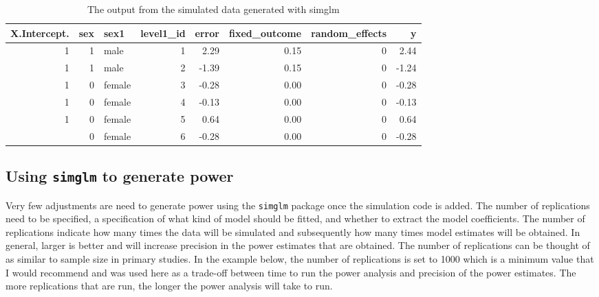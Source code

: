 \documentclass[man,mask,floatsintext]{apa6}
\begin{document}
\begin{table}[t]

\caption{\label{tab:simulate-data-out}The output from the simulated data generated with simglm}
\centering
\begin{tabular}{rrlrrrrr}
\toprule
X.Intercept. & sex & sex1 & level1\_id & error & fixed\_outcome & random\_effects & y\\
\midrule
1 & 1 & male & 1 & 2.29 & 0.15 & 0 & 2.44\\
1 & 1 & male & 2 & -1.39 & 0.15 & 0 & -1.24\\
1 & 0 & female & 3 & -0.28 & 0.00 & 0 & -0.28\\
1 & 0 & female & 4 & -0.13 & 0.00 & 0 & -0.13\\
1 & 0 & female & 5 & 0.64 & 0.00 & 0 & 0.64\\
\addlinespace
1 & 0 & female & 6 & -0.28 & 0.00 & 0 & -0.28\\
\bottomrule
\end{tabular}
\end{table}

\hypertarget{using-simglm-to-generate-power}{%
\subsection{\texorpdfstring{Using \texttt{simglm} to generate power}{Using simglm to generate power}}\label{using-simglm-to-generate-power}}

Very few adjustments are need to generate power using the \texttt{simglm} package once the simulation code is added. The number of replications need to be specified, a specification of what kind of model should be fitted, and whether to extract the model coefficients. The number of replications indicate how many times the data will be simulated and subsequently how many times model estimates will be obtained. In general, larger is better and will increase precision in the power estimates that are obtained. The number of replications can be thought of as similar to sample size in primary studies. In the example below, the number of replications is set to 1000 which is a minimum value that I would recommend and was used here as a trade-off between time to run the power analysis and precision of the power estimates. The more replications that are run, the longer the power analysis will take to run.
\end{document}
